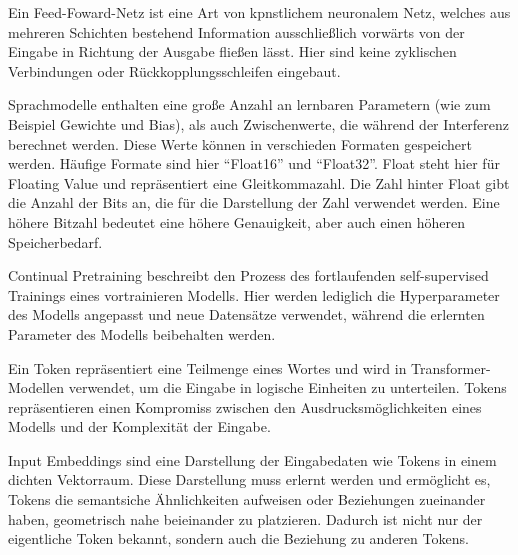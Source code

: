 \begin{definition}\label{def:feed-forward-netz}
    Ein Feed-Foward-Netz ist eine Art von kpnstlichem neuronalem Netz, welches aus mehreren Schichten bestehend Information ausschließlich vorwärts von der Eingabe in Richtung der Ausgabe fließen lässt. Hier sind keine zyklischen Verbindungen oder Rückkopplungsschleifen eingebaut.
\end{definition}

\begin{definition}[Parameterformate]\label{def:parameterformate}
    Sprachmodelle enthalten eine große Anzahl an lernbaren Parametern (wie zum Beispiel Gewichte und Bias), als auch
    Zwischenwerte, die während der Interferenz berechnet werden. Diese Werte können in verschieden Formaten gespeichert werden. Häufige Formate sind hier \enquote{Float16} und \enquote{Float32}. Float steht hier für Floating Value und repräsentiert eine Gleitkommazahl. Die Zahl hinter Float gibt die Anzahl der Bits an, die für die Darstellung der Zahl verwendet werden. Eine höhere Bitzahl bedeutet eine höhere Genauigkeit, aber auch einen höheren Speicherbedarf.
\end{definition}

\begin{definition}\label{def:continual-pretraining}
    Continual Pretraining beschreibt den Prozess des fortlaufenden self-supervised Trainings eines vortrainieren Modells.
    Hier werden lediglich die Hyperparameter des Modells angepasst und neue Datensätze verwendet, während die erlernten Parameter des Modells beibehalten werden.
\end{definition}

\begin{definition}[Token]\label{def:token}
    Ein Token repräsentiert eine Teilmenge eines Wortes und wird in Transformer-Modellen verwendet, um die Eingabe in logische Einheiten zu unterteilen. Tokens repräsentieren einen Kompromiss zwischen den Ausdrucksmöglichkeiten eines Modells und der Komplexität der Eingabe.
\end{definition}

\begin{definition}\label{def:input-embeddings}
    Input Embeddings sind eine Darstellung der Eingabedaten wie Tokens in einem dichten Vektorraum.
    Diese Darstellung muss erlernt werden und ermöglicht es,
    Tokens die semantsiche Ähnlichkeiten aufweisen oder Beziehungen zueinander haben, geometrisch nahe beieinander zu platzieren. Dadurch ist nicht nur der eigentliche Token bekannt, sondern auch die Beziehung zu anderen Tokens.
\end{definition}

